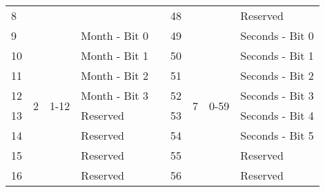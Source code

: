 \documentclass[]{article}
\begin{document}
\begin{table}[ht]
\begin{tabular}{lllllllll}
		8            &                    &                       &                               &                   & 48           &                     &                                                                                   & Reserved                  \\ \cline{1-4} \cline{6-9} 
		9            & \multirow{8}{*}{2} & \multirow{8}{*}{1-12} & Month - Bit 0                 &                   & 49           & \multirow{8}{*}{7}  & \multirow{8}{*}{0-59}                                                             & Seconds - Bit 0           \\
		10           &                    &                       & Month - Bit 1                 &                   & 50           &                     &                                                                                   & Seconds - Bit 1           \\
		11           &                    &                       & Month - Bit 2                 &                   & 51           &                     &                                                                                   & Seconds - Bit 2           \\
		12           &                    &                       & Month - Bit 3                 &                   & 52           &                     &                                                                                   & Seconds - Bit 3           \\
		13           &                    &                       & Reserved                      &                   & 53           &                     &                                                                                   & Seconds - Bit 4           \\
		14           &                    &                       & Reserved                      &                   & 54           &                     &                                                                                   & Seconds - Bit 5           \\
		15           &                    &                       & Reserved                      &                   & 55           &                     &                                                                                   & Reserved                  \\
		16           &                    &                       & Reserved                      &                   & 56           &                     &                                                                                   & Reserved                  \\ \cline{1-4} \cline{6-9} 

\end{tabular}
\end{table}
\end{document}
